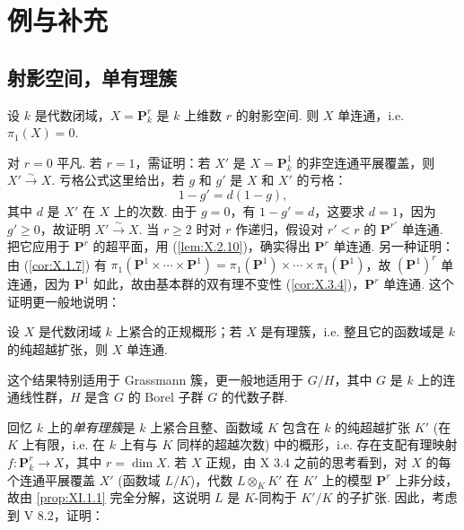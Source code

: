 \chapter{例与补充}

\section{射影空间，单有理簇}

\begin{proposition}\label{prop:XI.1.1}
设 $k$ 是代数闭域，$X = \mathbf{P}^r_k$ 是 $k$ 上维数 $r$ 的射影空间. 则 $X$ 单连通，i.e. $\pi_1(X) = 0$.
\end{proposition}

对 $r = 0$ 平凡. 若 $r = 1$，需证明：若 $X'$ 是 $X = \mathbf{P}^1_k$ 的非空连通平展覆盖，则 $X' \xrightarrow{\sim} X$. 亏格公式这里给出，若 $g$ 和 $g'$ 是 $X$ 和 $X'$ 的亏格：
\[
1 - g' = d(1 - g),
\]
其中 $d$ 是 $X'$ 在 $X$ 上的次数. 由于 $g = 0$，有 $1 - g' = d$，这要求 $d = 1$，因为 $g' \geqslant 0$，故证明 $X' \xrightarrow{\sim} X$. 当 $r \geqslant 2$ 时对 $r$ 作递归，假设对 $r' < r$ 的 $\mathbf{P}^{r'}$ 单连通. 把它应用于 $\mathbf{P}^r$ 的超平面，用 (\cref{lem:X.2.10})，确实得出 $\mathbf{P}^r$ 单连通. 另一种证明：由 (\cref{cor:X.1.7}) 有 $\pi_1(\mathbf{P}^1 \times \cdots \times \mathbf{P}^1) = \pi_1(\mathbf{P}^1) \times \cdots \times \pi_1(\mathbf{P}^1)$，故 $(\mathbf{P}^1)^r$ 单连通，因为 $\mathbf{P}^1$ 如此，故由基本群的双有理不变性 (\cref{cor:X.3.4})，$\mathbf{P}^r$ 单连通. 这个证明更一般地说明：

\begin{corollary}\label{cor:XI.1.2}
设 $X$ 是代数闭域 $k$ 上紧合的正规概形；若 $X$ 是有理簇，i.e. 整且它的函数域是 $k$ 的纯超越扩张，则 $X$ 单连通.
\end{corollary}

这个结果特别适用于 Grassmann 簇，更一般地适用于 $G/H$，其中 $G$ 是 $k$ 上的连通线性群，$H$ 是含 $G$ 的 Borel 子群 $G$ 的代数子群.

回忆 $k$ 上的\emph{单有理簇}是 $k$ 上紧合且整、函数域 $K$ 包含在 $k$ 的纯超越扩张 $K'$ (在 $K$ 上有限，i.e. 在 $k$ 上有与 $K$ 同样的超越次数) 中的概形，i.e. 存在支配有理映射 $f \colon \mathbf{P}^r_k \to X$，其中 $r = \dim X$. 若 $X$ 正规，由 X 3.4 之前的思考看到，对 $X$ 的每个连通平展覆盖 $X'$ (函数域 $L/K$)，代数 $L \otimes_K K'$ 在 $K'$ 上的模型 $\mathbf{P}^r$ 上非分歧，故由 \ref{prop:XI.1.1} 完全分解，这说明 $L$ 是 $K$-同构于 $K'/K$ 的子扩张. 因此，考虑到 V 8.2，证明：

